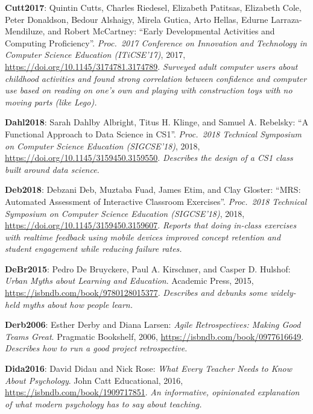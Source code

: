 \textbf{\hypertarget{b:Cutt2017}{Cutt2017}\label{b:Cutt2017}}: Quintin Cutts, Charles Riedesel, Elizabeth Patitsas, Elizabeth Cole, Peter Donaldson, Bedour Alshaigy, Mirela Gutica, Arto Hellas, Edurne Larraza-Mendiluze, and Robert McCartney: ``Early Developmental Activities and Computing Proficiency''. \emph{Proc.\ 2017 Conference on Innovation and Technology in Computer Science Education (ITiCSE'17)}, 2017, \url{https://doi.org/10.1145/3174781.3174789}. \emph{Surveyed adult computer users about childhood activities and found strong correlation between confidence and computer use based on reading on one's own and playing with construction toys with no moving parts (like Lego).}

\textbf{\hypertarget{b:Dahl2018}{Dahl2018}\label{b:Dahl2018}}: Sarah Dahlby Albright, Titus H. Klinge, and Samuel A. Rebelsky: ``A Functional Approach to Data Science in CS1''. \emph{Proc.\ 2018 Technical Symposium on Computer Science Education (SIGCSE'18)}, 2018, \url{https://doi.org/10.1145/3159450.3159550}. \emph{Describes the design of a CS1 class built around data science.}

\textbf{\hypertarget{b:Deb2018}{Deb2018}\label{b:Deb2018}}: Debzani Deb, Muztaba Fuad, James Etim, and Clay Gloster: ``MRS: Automated Assessment of Interactive Classroom Exercises''. \emph{Proc.\ 2018 Technical Symposium on Computer Science Education (SIGCSE'18)}, 2018, \url{https://doi.org/10.1145/3159450.3159607}. \emph{Reports that doing in-class exercises with realtime feedback using mobile devices improved concept retention and student engagement while reducing failure rates.}

\textbf{\hypertarget{b:DeBr2015}{DeBr2015}\label{b:DeBr2015}}: Pedro De Bruyckere, Paul A. Kirschner, and Casper D. Hulshof: \emph{Urban Myths about Learning and Education}. Academic Press, 2015, \url{https://isbndb.com/book/9780128015377}. \emph{Describes and debunks some widely-held myths about how people learn.}

\textbf{\hypertarget{b:Derb2006}{Derb2006}\label{b:Derb2006}}: Esther Derby and Diana Larsen: \emph{Agile Retrospectives: Making Good Teams Great}. Pragmatic Bookshelf, 2006, \url{https://isbndb.com/book/0977616649}. \emph{Describes how to run a good project retrospective.}

\textbf{\hypertarget{b:Dida2016}{Dida2016}\label{b:Dida2016}}: David Didau and Nick Rose: \emph{What Every Teacher Needs to Know About Psychology}. John Catt Educational, 2016, \url{https://isbndb.com/book/1909717851}. \emph{An informative, opinionated explanation of what modern psychology has to say about teaching.}

